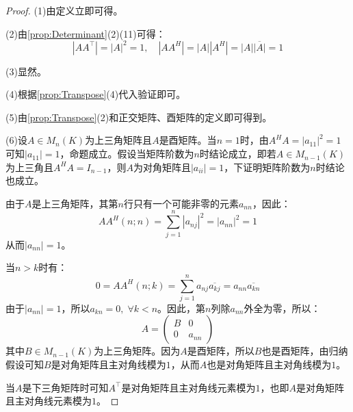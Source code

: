 \begin{proof}
	(1)由定义立即可得。\par
	(2)由\cref{prop:Determinant}(2)(11)可得：
	\begin{equation*}
		|AA^{\top}|=|A|^2=1,\quad|AA^H|=|A||A^H|=|A|\overline{|A|}=1
	\end{equation*}\par
	(3)显然。\par
	(4)根据\cref{prop:Transpose}(4)代入验证即可。\par
	(5)由\cref{prop:Transpose}(2)和正交矩阵、酉矩阵的定义即可得到。\par
	(6)设$A\in M_{n}(K)$为上三角矩阵且$A$是酉矩阵。当$n=1$时，由$A^HA=|a_{11}|^2=1$可知$|a_{11}|=1$，命题成立。假设当矩阵阶数为$n$时结论成立，即若$A\in M_{n-1}(K)$为上三角且$A^HA=I_{n-1}$，则$A$为对角矩阵且$|a_{ii}|=1$，下证明矩阵阶数为$n$时结论也成立。\par
	由于$A$是上三角矩阵，其第$n$行只有一个可能非零的元素$a_{nn}$，因此：
	\begin{equation*}
		AA^H(n;n)=\sum_{j=1}^{n} |a_{nj}|^2=|a_{nn}|^2=1
	\end{equation*}
	从而$|a_{nn}|=1$。\par
	当$n>k$时有：
	\begin{equation*}
		0=AA^H(n;k)=\sum_{j=1}^{n}a_{nj}\overline{a_{kj}}=a_{nn}\overline{a_{kn}}
	\end{equation*}
	由于$|a_{nn}|=1$，所以$a_{kn}=0,\;\forall k<n$。因此，第$n$列除$a_{nn}$外全为零，所以：
	\begin{equation*}
		A= 
		\begin{pmatrix}
			B & 0 \\
			0 & a_{nn}
		\end{pmatrix}
	\end{equation*}
	其中$B\in M_{n-1}(K)$为上三角矩阵。因为$A$是酉矩阵，所以$B$也是酉矩阵，由归纳假设可知$B$是对角矩阵且主对角线模为$1$，从而$A$也是对角矩阵且主对角线模为$1$。\par
	当$A$是下三角矩阵时可知$A^{\top}$是对角矩阵且主对角线元素模为$1$，也即$A$是对角矩阵且主对角线元素模为$1$。
\end{proof}
